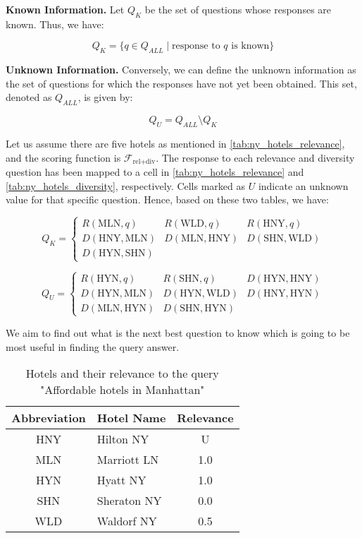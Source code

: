 \textbf{Known Information.} Let \( Q_K \) be the set of questions whose  responses are known. Thus, we have:

\[
Q_K = \{ q \in Q_{ALL} \mid \text{response to } q \text{ is known} \}
\]

\textbf{Unknown Information.} Conversely, we can define the unknown information as the set of questions for which the responses have not yet been obtained. This set, denoted as \( Q_{ALL} \), is given by:

\[
Q_U = Q_{ALL} \setminus Q_K
\]

\begin{example}
    Let us assume there are five hotels as mentioned in \autoref{tab:ny_hotels_relevance}, and the scoring function is $\mathcal{F}_{\text{rel+div}}$. The response to each relevance and diversity question has been mapped to a cell in \autoref{tab:ny_hotels_relevance} and \autoref{tab:ny_hotels_diversity}, respectively. Cells marked as $U$ indicate an unknown value for that specific question. Hence, based on these two tables, we have:

\[
Q_K = \left\{
\begin{array}{lll}
R(\text{MLN}, q) & R(\text{WLD}, q) & R(\text{HNY}, q) \\
D(\text{HNY}, \text{MLN}) & D(\text{MLN}, \text{HNY}) & D(\text{SHN}, \text{WLD}) \\
D(\text{HYN}, \text{SHN}) & &
\end{array}
\right.
\]


\[
Q_U = \left\{
\begin{array}{lll}
R(\text{HYN}, q) & R(\text{SHN}, q) & D(\text{HYN}, \text{HNY}) \\
D(\text{HYN}, \text{MLN}) & D(\text{HYN}, \text{WLD}) & D(\text{HNY}, \text{HYN}) \\
D(\text{MLN}, \text{HYN}) & D(\text{SHN}, \text{HYN}) &
\end{array}
\right.
\]

We aim to find out what is the next best question to know which is going to be most useful in finding the query answer. 

\end{example}



\begin{table}[h!]
\centering
\begin{tabular}{|c|l|c|}
\hline
\textbf{Abbreviation} & \textbf{Hotel Name} & \textbf{Relevance} \\ \hline
HNY & Hilton NY      & U \\ \hline
MLN & Marriott LN    & 1.0 \\ \hline
HYN & Hyatt NY       & 1.0 \\ \hline
SHN & Sheraton NY    & 0.0 \\ \hline
WLD & Waldorf NY     & 0.5 \\ \hline
\end{tabular}
\caption{Hotels and their relevance to the query "Affordable hotels in Manhattan"}
\label{tab:ny_hotels_relevance}
\end{table}



